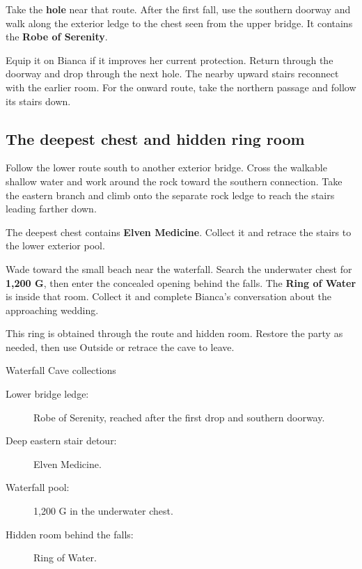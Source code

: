 Take the \textbf{hole} near that route. After the first fall, use
the southern doorway and walk along the exterior ledge to the chest
seen from the upper bridge. It contains the \textbf{Robe of Serenity}.

Equip it on Bianca if it improves her current protection. Return
through the doorway and drop through the next hole. The nearby upward
stairs reconnect with the earlier room. For the onward route, take
the northern passage and follow its stairs down.

\subsection*{The deepest chest and hidden ring room}

Follow the lower route south to another exterior bridge. Cross the
walkable shallow water and work around the rock toward the southern
connection. Take the eastern branch and climb onto the separate rock
ledge to reach the stairs leading farther down.

The deepest chest contains \textbf{Elven Medicine}. Collect it and
retrace the stairs to the lower exterior pool.

Wade toward the small beach near the waterfall. Search the underwater
chest for \textbf{1,200 G}, then enter the concealed opening behind
the falls. The \textbf{Ring of Water} is inside that room. Collect
it and complete Bianca's conversation about the approaching wedding.


This ring is obtained through the route and hidden room. Restore
the party as needed, then use Outside or retrace the cave to leave.

\begin{routecheck}{Waterfall Cave collections}
\begin{description}
  \item[Lower bridge ledge:] Robe of Serenity, reached after the first
    drop and southern doorway.
  \item[Deep eastern stair detour:] Elven Medicine.
  \item[Waterfall pool:] 1,200 G in the underwater chest.
  \item[Hidden room behind the falls:] Ring of Water.
\end{description}
\end{routecheck}

